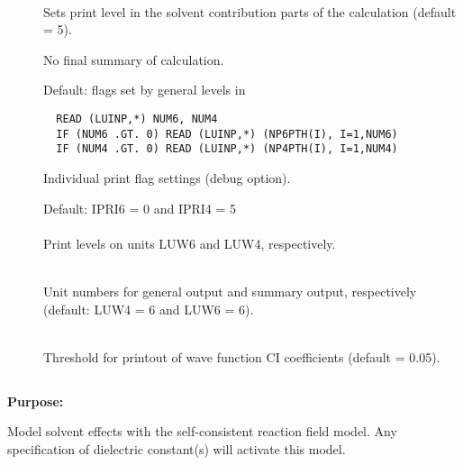 \begin{description}
\item[]
   \\
  Sets print level in the solvent contribution parts of the
  calculation (default = 5).

\item[]
  No final summary of calculation.
 
\item[]
 Default: flags set by general levels in 
\begin{verbatim}
  READ (LUINP,*) NUM6, NUM4
  IF (NUM6 .GT. 0) READ (LUINP,*) (NP6PTH(I), I=1,NUM6)
  IF (NUM4 .GT. 0) READ (LUINP,*) (NP4PTH(I), I=1,NUM4)
\end{verbatim}
  Individual print flag settings (debug option).

\item[]
  Default: IPRI6 = 0 and IPRI4 = 5 \\
   \\
  Print levels on units LUW6 and LUW4, respectively.
 
\item[]
   \\
  Unit numbers for general output and summary output, respectively
  (default: LUW4 = 6 and LUW6 = 6).
 
\item[]
   \\
  Threshold for printout of wave function CI coefficients (default = 0.05).
 \end{description}
 


\ifsolvent
\pagebreak[3]
\subsection{\label{ref-solinp}}
 
{\bf Purpose:}
 
Model solvent effects with the self-consistent reaction field model.
Any specification of dielectric constant(s)
will activate this model. 
 
